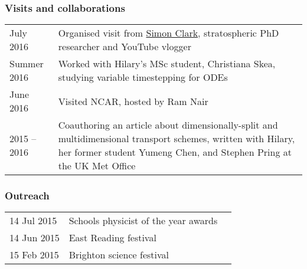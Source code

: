 \documentclass[a4paper,11pt]{article}
\begin{document}
\subsubsection*{Visits and collaborations}
\begin{tabularx}{\linewidth}{l X}
July 2016 & Organised visit from \href{https://www.youtube.com/user/SimonOxfPhys}{Simon Clark}, stratospheric PhD researcher and YouTube vlogger \\
Summer 2016 & Worked with Hilary's MSc student, Christiana Skea, studying variable timestepping for ODEs \\
June 2016 & Visited NCAR, hosted by Ram Nair \\
2015 -- 2016 & Coauthoring an article about dimensionally-split and multidimensional transport schemes, written with Hilary, her former student Yumeng Chen, and Stephen Pring at the UK Met Office \\
\end{tabularx}

\subsubsection*{Outreach}
\begin{tabular}{l l l}
14 Jul 2015 & Schools physicist of the year awards \\
14 Jun 2015 & East Reading festival \\
15 Feb 2015 & Brighton science festival \\
\end{tabular}
\end{document}
